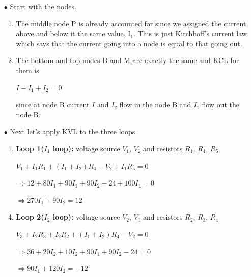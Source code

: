 \documentclass[a4 paper]{article}
\numberwithin{equation}{section}
\newcommand{\0}{\mathbf{0}}
\begin{document}
\begin{itemize} \itemsep1pt \parskip0pt 
  \item[$\bullet$] Start with the nodes.
  \begin{enumerate} \itemsep1pt \parskip0pt 
  \item The middle node P is already accounted for since we assigned the current above and below it the same value, I$_1$.  This is just Kirchhoff’s current law which says that the current going into a node is equal to that going out. 
  \item The bottom and top nodes B and M are exactly the same and KCL for them is \newline \newline 
  \centerline{$I - I_1 + I_2 = 0$}
  since at node B current $I$ and $I_2$ flow in the node B and $I_1$ flow out the node B.
  \end{enumerate}
  \item[$\bullet$] Next let's apply KVL to the three loops
  \begin{enumerate} \itemsep1pt \parskip0pt 
    \item {\bf Loop 1($I_1$ loop):} voltage source $V_1$, $V_2$ and resistors $R_1$, $R_4$, $R_5$ \newline\newline
    \centerline{$V_1 + I_1R_1 + (I_1+I_2)R_4 - V_2 + I_1R_5 = 0$}\newline
    \item[] \hspace{56 mm}$\Rightarrow 12 + 80I_1 + 90I_1 + 90I_2 - 24 + 100I_1 = 0$
    \newline
    \item[] \hspace{56 mm}$\Rightarrow 270I_1 + 90I_2 = 12$
    \newline

    \item {\bf Loop 2($I_2$ loop):} voltage source $V_2$, $V_3$ and resistors $R_2$, $R_3$, $R_4$ \newline\newline
    \centerline{$V_3 + I_2R_3 + I_2R_2 + (I_1 + I_2)R_4 -V_2 = 0$}
    \newline
    \item[] \hspace{56 mm}$\Rightarrow 36 + 20I_2 + 10I_2 + 90I_1 + 90I_2- 24 = 0$ \newline
    \item[] \hspace{56 mm}$\Rightarrow 90I_1 + 120I_2 = -12$
    \newline
  

\end{enumerate}
\end{itemize}
\end{document}
